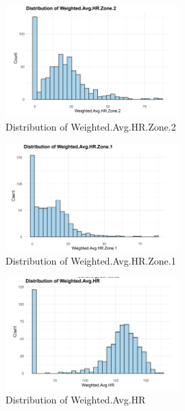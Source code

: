 \documentclass{article}
\begin{document}
\begin{figure}[h!]
  \centering
  \includegraphics[width=0.6\textwidth]{images/Weighted_Avg_HR_Zone_2.png}
  \caption{Distribution of Weighted.Avg.HR.Zone.2}
  \label{fig:weighted_avg_hr_zone_2}
\end{figure}

\begin{figure}[h!]
  \centering
  \includegraphics[width=0.6\textwidth]{images/Weighted_Avg_HR_Zone_1.png}
  \caption{Distribution of Weighted.Avg.HR.Zone.1}
  \label{fig:weighted_avg_hr_zone_1}
\end{figure}

\begin{figure}[h!]
  \centering
  \includegraphics[width=0.6\textwidth]{images/Weighted_Avg_HR.png}
  \caption{Distribution of Weighted.Avg.HR}
  \label{fig:weighted_avg_hr}
\end{figure}

\newpage
\end{document}
